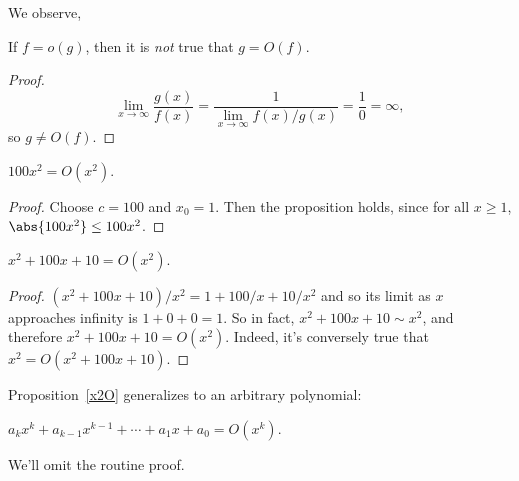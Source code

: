 We observe,
\begin{lemma}
If $f = o(g)$, then it is \emph{not} true that $g = O(f)$.
\end{lemma}
\begin{proof}
\[
\lim_{x \rightarrow \infty} \frac{g(x)}{f(x)} =
 \frac{1}{\lim_{x \rightarrow \infty} f(x)/g(x)} =
 \frac{1}{0} = \infty,
\]
so $g \neq O(f)$.

\end{proof}

\begin{proposition}
$100x^2 = O(x^2)$.
\end{proposition}

\begin{proof}
Choose $c = 100$ and $x_0 = 1$.  Then the proposition holds, since for all
$x \geq 1$, $\abs{100x^2} \leq 100 x^2$.
\end{proof}

\begin{proposition}\label{x2O}
$x^2 + 100x + 10 = O(x^2)$.
\end{proposition}

\begin{proof}
$(x^2 + 100x + 10)/x^2 = 1 + 100/x + 10/x^2$ and so its limit as $x$
approaches infinity is $1 + 0 + 0 = 1$.  So in fact, $x^2 + 100x + 10 \sim
x^2$, and therefore $x^2 + 100x + 10 = O(x^2)$.  Indeed, it's conversely
true that $x^2= O(x^2 + 100x + 10)$.
\end{proof}

Proposition~\ref{x2O} generalizes to an arbitrary polynomial:
\begin{proposition}
    $a_k x^k + a_{k-1} x^{k-1} + \cdots + a_1x + a_0 = O(x^k)$.
\end{proposition}
We'll omit the routine proof.


